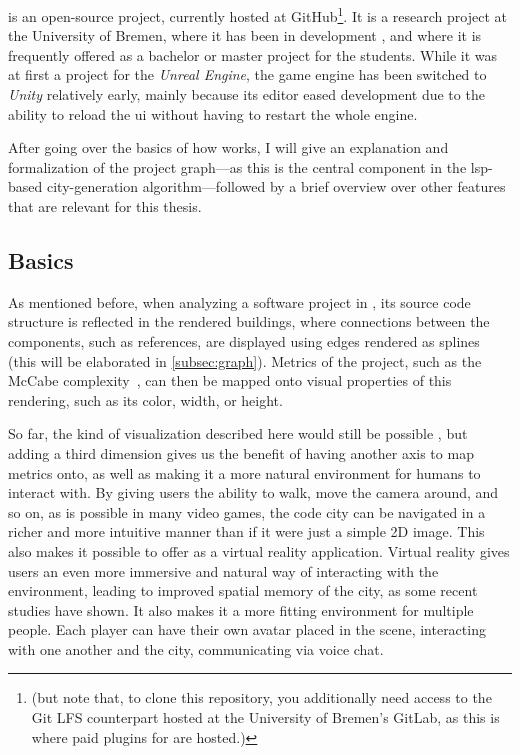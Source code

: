 \documentclass[../thesis]{subfiles}
\begin{document}

\SEE{} is an open-source project, currently hosted at GitHub\footnote{ (but note that, to clone this repository, you additionally need access to the Git LFS counterpart hosted at the University of Bremen's GitLab, as this is where paid plugins for \SEE{} are hosted.)}.
It is a research project at the University of Bremen, where it has been in development , and where it is frequently offered as a bachelor or master project for the students.
While it was at first a project for the \emph{Unreal Engine}, the game engine has been switched to \emph{Unity} relatively early, mainly because its editor eased development due to the ability to reload the \gls*{ui} without having to restart the whole engine.

After going over the basics of how \SEE{} works, I will give an explanation and formalization of the project graph---as this is the central component in the \gls{lsp}-based \gls{city}-generation algorithm---followed by a brief overview over other features that are relevant for this thesis.

\subsection{Basics}
As mentioned before, when analyzing a software project in \SEE{}, its source code structure is reflected in the rendered buildings, where connections between the components, such as references, are displayed using edges rendered as splines (this will be elaborated in \cref{subsec:graph}).
Metrics of the project, such as the McCabe complexity~\cite{mccabe}, can then be mapped onto visual properties of this rendering, such as its color, width, or height.

So far, the kind of visualization described here would still be possible , but adding a third dimension gives us the benefit of having another axis to map metrics onto, as well as making it a more natural environment for humans to interact with.
By giving users the ability to walk, move the camera around, and so on, as is possible in many video games, the code city can be navigated in a richer and more intuitive manner than if it were just a simple 2D image.
This also makes it possible to offer \SEE{} as a virtual reality application.
Virtual reality gives users an even more immersive and natural way of interacting with the environment, leading to improved spatial memory of the city, as some recent studies have shown.
It also makes it a more fitting environment for multiple people.
Each player can have their own avatar placed in the scene, interacting with one another and the city, communicating via voice chat.
\end{document}
